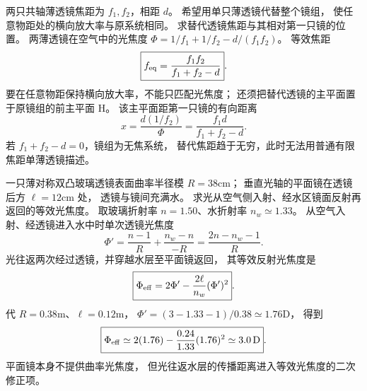 两只共轴薄透镜焦距为
$f_1,f_2$，相距 $d$。
希望用单只薄透镜代替整个镜组，
使任意物距处的横向放大率与原系统相同。
求替代透镜焦距与其相对第一只镜的位置。
\exsolution
两薄透镜在空气中的光焦度
$\Phi=1/f_1+1/f_2-d/(f_1f_2)$。
等效焦距
\[
\boxed{f_{\rm eq}=\frac{f_1f_2}{f_1+f_2-d}}.
\]
要在任意物距保持横向放大率，不能只匹配光焦度；
还须把替代透镜的主平面置于原镜组的前主平面 H。
该主平面距第一只镜的有向距离
\[
\boxed{x=\frac{d(1/f_2)}{\Phi}
=\frac{f_1d}{f_1+f_2-d}}.
\]
\excheck 若 $f_1+f_2-d=0$，镜组为无焦系统，
替代焦距趋于无穷，此时无法用普通有限焦距单薄透镜描述。

一只薄对称双凸玻璃透镜表面曲率半径模
$R=38$cm；
垂直光轴的平面镜在透镜后方
$\ell=12$cm 处，
透镜与镜间充满水。
求光从空气侧入射、经水区镜面反射再返回的等效光焦度。
\exsolution
取玻璃折射率 $n=1.50$、水折射率
$n_w\simeq1.33$。
从空气入射、经透镜进入水中时单次透镜光焦度
\[
\Phi'=\frac{n-1}{R}+
\frac{n_w-n}{-R}
=\frac{2n-n_w-1}{R}.
\]
光往返两次经过透镜，并穿越水层至平面镜返回，
其等效反射光焦度是
\[
\boxed{\Phi_{\rm eff}
=2\Phi'-\frac{2\ell}{n_w}(\Phi')^2}.
\]
代 $R=0.38$m、$\ell=0.12$m，
$\Phi'=(3-1.33-1)/0.38\simeq1.76$D，
得到
\[
\boxed{\Phi_{\rm eff}\simeq
2(1.76)-\frac{0.24}{1.33}(1.76)^2
\simeq3.0\,\mathrm D}.
\]
\excheck 平面镜本身不提供曲率光焦度，
但光往返水层的传播距离进入等效光焦度的二次修正项。
